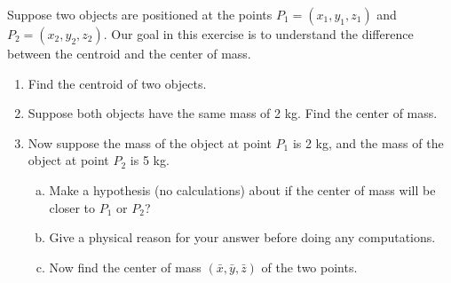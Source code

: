 \begin{problem}\label{center of mass with two points}%
Suppose two objects are positioned at the points $P_1=(x_1,y_1,z_1)$ and $P_2=(x_2,y_2,z_2)$. Our goal in this exercise is to understand the difference between the centroid and the center of mass.
\begin{enumerate}
\item Find the centroid of two objects.
	\item Suppose both objects have the same mass of 2 kg.  Find the center of mass.%
	\item Now suppose the mass of the object at point $P_1$ is 2 kg, and the mass of the object at point $P_2$ is 5 kg.
	\begin{enumerate}[a)]
		\item Make a hypothesis (no calculations) about if the center of mass will be closer to $P_1$ or $P_2$? 
		\item Give a physical reason for your answer before doing any computations.  
		\item Now find the center of mass $(\bar x, \bar y, \bar z)$ of the two points. 
		\marginpar{[Hint: You should get $\bar x= \frac{2x_1+5x_2}{2+5}$.]}
	\end{enumerate}
\end{enumerate}
\end{problem}

